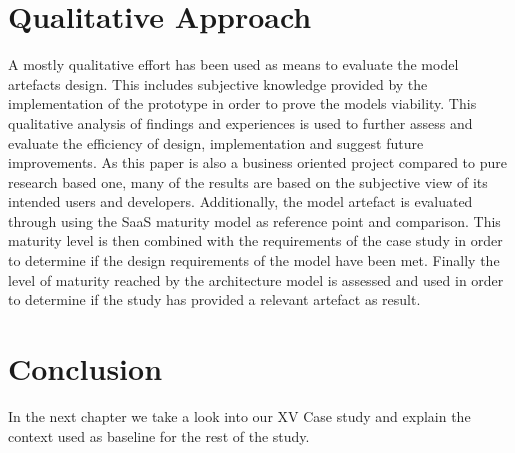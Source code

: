 \section{Qualitative Approach}

A mostly qualitative effort has been used as means to evaluate the model artefacts design. This includes subjective knowledge provided by the implementation of the prototype in order to prove the models viability. This qualitative analysis of findings and experiences is used to further assess and evaluate the efficiency of design, implementation and suggest future improvements. As this paper is also a business oriented project compared to pure research based one, many of the results are based on the subjective view of its intended users and developers. Additionally, the model artefact is evaluated through using the SaaS maturity model as reference point and comparison. This maturity level is then combined with the requirements of the case study in order to determine if the design requirements of the model have been met. Finally the level of maturity reached by the architecture model is assessed and used in order to determine if the study has provided a relevant artefact as result.


\section{Conclusion}

In the next chapter we take a look into our XV Case study and explain the context used as baseline for the rest of the study.

